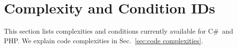 \documentclass[12pt]{article}
\newcommand{\CSharp}{C{\fontseries{b}\selectfont\#}}
\begin{document}



\newpage

%
%

\clearpage

\appendix

\section{Complexity and Condition IDs}
\label{sec: complexity and condition IDs}

This section lists complexities and conditions currently
available for \CSharp\ and PHP.
We explain code complexities in Sec.~\ref{sec:code complexities}.

\end{document}
